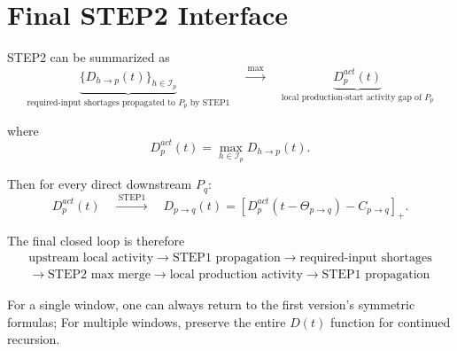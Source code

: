\documentclass[11pt]{article}
\begin{document}
\section{Final STEP2 Interface}

STEP2 can be summarized as
\[
\boxed{
\underbrace{
\{D_{h\to p}(t)\}_{h\in\mathcal I_p}
}_{\text{required-input shortages propagated to \(P_p\) by STEP1}}
\quad
\xrightarrow{\ \max\ }
\quad
\underbrace{
D_p^{act}(t)
}_{\text{local production-start activity gap of \(P_p\)}}
}
\tag{35}
\]

where
\[
\boxed{
D_p^{act}(t)
=
\max_{h\in\mathcal I_p}
D_{h\to p}(t).
}
\]

Then for every direct downstream \(P_q\):
\[
\boxed{
D_p^{act}(t)
\quad
\xrightarrow{\ \mathrm{STEP1}\ }
\quad
D_{p\to q}(t)
=
[D_p^{act}(t-\Theta_{p\to q})-C_{p\to q}]_+.
}
\tag{36}
\]

The final closed loop is therefore
\[
\boxed{\begin{gathered}
\text{upstream local activity}
\rightarrow
\text{STEP1 propagation}
\rightarrow
\text{required-input shortages}\\
\rightarrow
\text{STEP2 max merge}
\rightarrow
\text{local production activity}
\rightarrow
\text{STEP1 propagation}
\end{gathered}}
\]

For a single window, one can always return to the first version's symmetric formulas;
For multiple windows, preserve the entire \(D(t)\) function for continued recursion.
\end{document}
